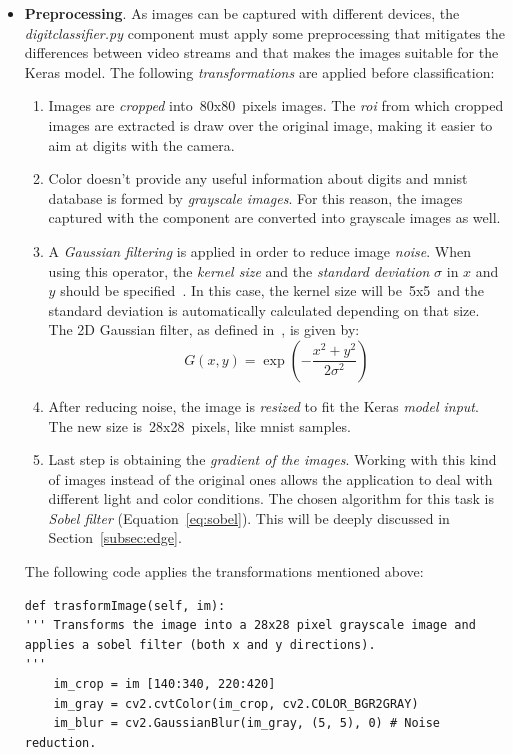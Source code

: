 \begin{itemize}
	\item \textbf{Preprocessing}. As images can be captured with different devices, the \textit{digitclassifier.py} component must apply some preprocessing that mitigates the differences between video streams and that makes the images suitable for the Keras model. The following \emph{transformations} are applied before classification:
	\begin{enumerate}
		\item Images are \emph{cropped} into~80x80~pixels images. The \emph{\gls{roi}} from which cropped images are extracted is draw over the original image, making it easier to aim at digits with the camera.
		\item Color doesn't provide any useful information about digits and \gls{mnist} database is formed by \emph{grayscale images}. For this reason, the images captured with the component are converted into grayscale images as well. 
		\item A \emph{Gaussian filtering} is applied in order to reduce image \emph{noise}. When using this operator, the \emph{kernel size} and the \emph{standard deviation} $\sigma$ in $x$ and $y$ should be specified~\cite{itseez2014theopencv}. In this case, the kernel size will be~5x5~and the standard deviation is automatically calculated depending on that size. The 2D Gaussian filter, as defined in~\cite{sonka1999image}, is given by:
		\begin{equation}
		G(x,y)=\exp(-\frac{x^2+y^2}{2\sigma^2})
		\end{equation}
		\item After reducing noise, the image is \emph{resized} to fit the Keras \emph{model input}. The new size is~28x28~pixels, like \gls{mnist} samples.
		\item Last step is obtaining the \emph{gradient of the images}. Working with this kind of images instead of the original ones allows the application to deal with different light and color conditions. The chosen algorithm for this task is \emph{Sobel filter} (Equation~\ref{eq:sobel}). This will be deeply discussed in Section~\ref{subsec:edge}.
	\end{enumerate}
	
	The following code applies the transformations mentioned above:
\begin{lstlisting}[frame=single]
def trasformImage(self, im):
''' Transforms the image into a 28x28 pixel grayscale image and
applies a sobel filter (both x and y directions).
''' 
	im_crop = im [140:340, 220:420]
	im_gray = cv2.cvtColor(im_crop, cv2.COLOR_BGR2GRAY)
	im_blur = cv2.GaussianBlur(im_gray, (5, 5), 0) # Noise reduction.
	

\end{lstlisting}
\end{itemize}
